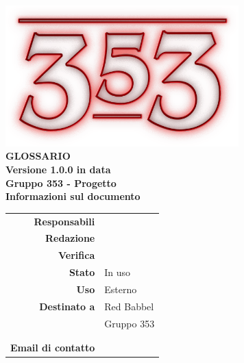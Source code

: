 \documentclass[openany, a4paper, 12pt]{report}
\begin{document}
\begin{titlepage}
\centering
\vfill
{
	\bfseries
	\vskip2cm
	\includegraphics[width=9cm]{../../common/images/logo.png} \\
	\vfill
	\Huge{GLOSSARIO}\\
	\vfill
	\Large Versione 1.0.0 in data \\
	\large Gruppo 353 - Progetto \progetto \\
	\vfill
	\normalsize Informazioni sul documento\\
	\begin{table}[htbp]
		\centering
		\renewcommand\arraystretch{1.2}
		\begin{tabular}{r|l}
			\hline
			\textbf{Responsabili}	& \Elena\\
			
			\textbf{Redazione} 		& \Valentina \\
			\textbf{Verifica} 		& \Davide \\	
			
			\textbf{Stato} 			& In uso\\
			\textbf{Uso}			& Esterno\\
			\textbf{Destinato a}   	& Red Babbel\\
									& Gruppo 353\\
									& \Vardanega\\
									& \Cardin\\
			
			\textbf{Email di contatto}	& \mailgroup
		\end{tabular}
	\end{table}
	\vfill 
}      
\end{titlepage}

%
\printglossary
 
\end{document}
